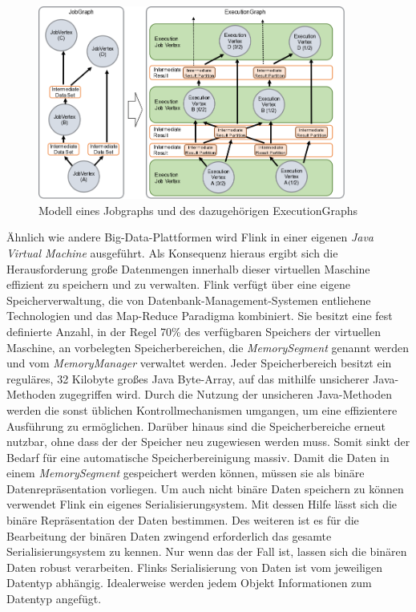 \begin{figure}[h]
	\centering
	\includegraphics[width=0.9\textwidth]{picture/flink_job_and_execution_graph.png}
	\caption{Modell eines Jobgraphs und des dazugehörigen ExecutionGraphs}
\end{figure}

Ähnlich wie andere Big-Data-Plattformen wird Flink in einer eigenen \textit{Java Virtual Machine} ausgeführt. Als Konsequenz hieraus ergibt sich die Herausforderung große Datenmengen innerhalb dieser virtuellen Maschine effizient zu speichern und zu verwalten. Flink verfügt über eine eigene Speicherverwaltung, die von Datenbank-Management-Systemen entliehene Technologien und das Map-Reduce Paradigma kombiniert. Sie besitzt eine fest definierte Anzahl, in der Regel 70\% des verfügbaren Speichers der virtuellen Maschine, an vorbelegten Speicherbereichen, die \textit{MemorySegment} genannt werden und vom \textit{MemoryManager} verwaltet werden. Jeder Speicherbereich besitzt ein reguläres, 32 Kilobyte großes Java Byte-Array, auf das mithilfe unsicherer Java-Methoden zugegriffen wird. Durch die Nutzung der unsicheren Java-Methoden werden die sonst üblichen Kontrollmechanismen umgangen, um eine effizientere Ausführung zu ermöglichen. Darüber hinaus sind die Speicherbereiche erneut nutzbar, ohne dass der der Speicher neu zugewiesen werden muss. Somit sinkt der Bedarf für eine automatische Speicherbereinigung massiv. Damit die Daten in einem \textit{MemorySegment} gespeichert werden können, müssen sie als binäre Datenrepräsentation vorliegen. Um auch nicht binäre Daten speichern zu können verwendet Flink ein eigenes Serialisierungsystem. Mit dessen Hilfe lässt sich die binäre Repräsentation der Daten bestimmen. Des weiteren ist es für die Bearbeitung der binären Daten zwingend erforderlich das gesamte Serialisierungsystem zu kennen. Nur wenn das der Fall ist, lassen sich die binären Daten robust verarbeiten. Flinks Serialisierung von Daten ist vom jeweiligen Datentyp abhängig. Idealerweise werden jedem Objekt Informationen zum Datentyp angefügt.


